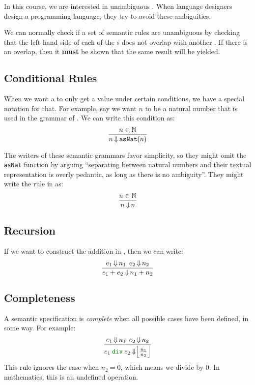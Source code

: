 In this course, we are interested in unambiguous .
When language designers design a programming language, they try to avoid these ambiguities.

We can normally check if a set of semantic rules are unambiguous by checking that the left-hand side of each of the s does not overlap with another .
If there is an overlap, then it \textbf{must} be shown that the same result will be yielded.

\subsection{Conditional Rules}\label{subsec:Conditional_Rules}
When we want a  to only get a value under certain conditions, we have a special notation for that.
For example, say we want $n$ to be a natural number that is used in the grammar of .
We can write this condition as:
\begin{equation}\label{eq:Conditional_Rules}
  \frac{n \in \operatorname{\mathbb{N}}}{n \operatorname{\Downarrow} \mathtt{asNat}(n)}
\end{equation}

The writers of these semantic grammars favor simplicity, so they might omit the \texttt{asNat} function by arguing ``separating between natural numbers and their textual representation is overly pedantic, as long as there is no ambiguity''.
They might write the rule in  as:
\begin{equation}\label{eq:Conditional_Rules_Simplified}
  \frac{n \in \operatorname{\mathbb{N}}}{n \operatorname{\Downarrow} n}
\end{equation}

\subsection{Recursion}\label{subsec:Semantics_Recursion}
If we want to construct the addition in , then we can write:
\begin{equation}\label{eq:Semantics_Recursion}
  \frac{e_{1} \operatorname{\Downarrow} n_{1} \:\: e_{2} \operatorname{\Downarrow} n_{2}}{e_{1}+e_{2} \operatorname{\Downarrow} n_{1}+n_{2}}
\end{equation}

\subsection{Completeness}\label{subsec:Semantic_Completeness}
A semantic specification is \emph{complete} when all possible cases have been defined, in some way.
For example:
\begin{equation}\label{eq:Incomplete_Semantic_Rule}
  \frac{e_{1} \EvaluatesTo n_{1} \:\: e_{2} \EvaluatesTo n_{2}}{e_{1} \:\textcolor{Green4}{\mathtt{div}}\: e_{2} \EvaluatesTo \Bigl\lfloor \frac{n_{1}}{n_{2}} \Bigr\rfloor}
\end{equation}
This rule ignores the case when $n_{2} = 0$, which means we divide by 0.
In mathematics, this is an undefined operation.

